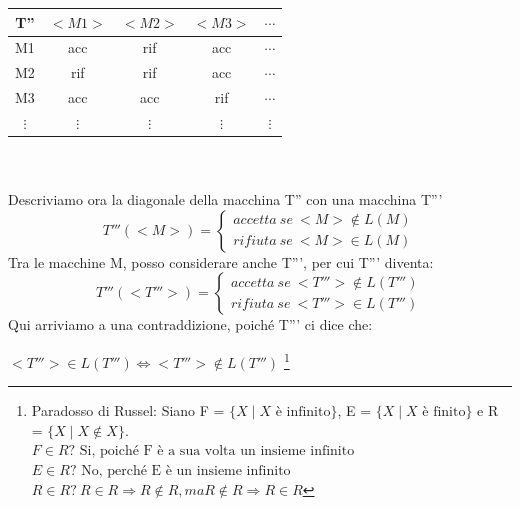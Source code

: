 \begin{tabular}[left]{ c | c c c c }
	T'' & $<M1>$ & $<M2>$ & $<M3>$ & $\cdots$ \\
	\hline
	M1 & acc & rif & acc & $\cdots$ \\
	M2 & rif & rif & acc & $\cdots$ \\
	M3 & acc & acc & rif & $\cdots$ \\
	$\vdots$ & $\vdots$ & $\vdots$ & $\vdots$ & $\vdots$ 
\end{tabular} \\ \\
Descriviamo ora la diagonale della macchina T'' con una macchina T'''
\begin{equation*}
	T'''(<M>) =
	\begin{cases}
   	accetta \ se \ <M> \notin L(M)\\rifiuta \ se \ <M> \in L(M)
   	\end{cases}
\end{equation*}
Tra le macchine M, posso considerare anche T''', per cui T''' diventa:
\begin{equation*}
	T'''(<T'''>) =
	\begin{cases}
   	accetta \ se \ <T'''> \notin L(T''')\\rifiuta \ se \ <T'''> \in L(T''')
   	\end{cases}
\end{equation*}
Qui arriviamo a una contraddizione, poiché T''' ci dice che:
\begin{center}
	$<T'''> \in L(T''') \Leftrightarrow <T'''> \notin L(T''')$ \footnote{Paradosso di Russel: Siano F = $\{X \mid X \text{ è infinito}\}$, E = $\{X \mid X \text{ è finito}\}$ e R = $\{X \mid X \notin X\}$. \\
	$F \in R? \text{ Si, poiché F è a sua volta un insieme infinito}$ \\
	$E \in R? \text{ No, perché E è un insieme infinito}$ \\
	$R \in R? \ R \in R \Rightarrow R \notin R, ma R \notin R \Rightarrow R \in R $ }
\end{center} 
